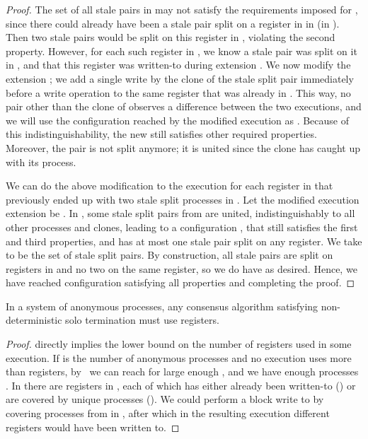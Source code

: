 \begin{proof}
The set of all stale pairs in  may not satisfy the requirements imposed for ,
  since there could already have been a stale pair split on a register in  in  (in ).
Then two stale pairs would be split on this register in , violating the second property.
However, for each such register in , 
  we know a stale pair  was split on it in ,
  and that this register was written-to during extension .
We now modify the extension ; we add a single write by the clone of the stale split pair 
  immediately before a write operation to the same register that was already in .
This way, no pair other than the clone of  observes a difference between the two executions, 
  and we will use the configuration reached by the modified execution as .
Because of this indistinguishability, the new  still satisfies other required properties.
Moreover, the pair  is not split anymore; it is united since the clone has caught up with its process.

We can do the above modification to the execution for each register in  
  that previously ended up with two stale split processes in .
Let the modified execution extension be .
In , some stale split pairs from  are united, indistinguishably to all other processes and clones, 
  leading to a configuration , that still satisfies the first and third properties,
  and has at most one stale pair split on any register.
We take  to be the set of stale split pairs.
By construction, all stale pairs are split on registers in  and no two on the same register, 
  so we do have  as desired.
Hence, we have reached configuration  satisfying all properties and completing the proof.
\end{proof}
\begin{corollary}
In a system of  anonymous processes, 
  any consensus algorithm satisfying non-deterministic solo termination must use  registers.
\end{corollary}
\begin{proof}
 directly implies the  lower bound on the number of registers used in some execution.
If  is the number of anonymous processes and no execution uses more than  registers,
  by~ we can reach  for large enough , and we have enough processes .
In  there are  registers in , each of which has either already been written-to ()
  or are covered by unique processes ().
We could perform a block write to  by covering processes from  in , 
  after which in the resulting execution  different registers would have been written to.
\end{proof}
